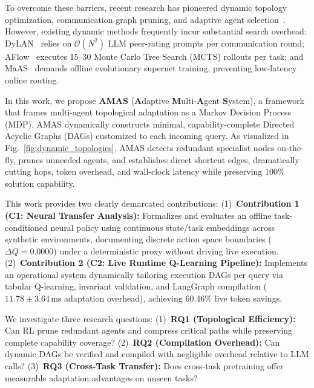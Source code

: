 \documentclass[conference]{IEEEtran}
\begin{document}
To overcome these barriers, recent research has pioneered dynamic topology optimization, communication graph pruning, and adaptive agent selection~\cite{liu2024dylan,zhuge2024gptswarm,zhang2024aflow,Zhang2025MaAS,Li2025AdaptiveGraphPruning,xiao2026agentdropout,zhang2025gdesigner}. However, existing dynamic methods frequently incur substantial search overhead: DyLAN~\cite{liu2024dylan} relies on $\mathcal{O}(N^2)$ LLM peer-rating prompts per communication round; AFlow~\cite{zhang2024aflow} executes 15--30 Monte Carlo Tree Search (MCTS) rollouts per task; and MaAS~\cite{Zhang2025MaAS} demands offline evolutionary supernet training, preventing low-latency online routing.

In this work, we propose \textbf{AMAS} (\textbf{A}daptive \textbf{M}ulti-\textbf{A}gent \textbf{S}ystem), a framework that frames multi-agent topological adaptation as a Markov Decision Process (MDP). AMAS dynamically constructs minimal, capability-complete Directed Acyclic Graphs (DAGs) customized to each incoming query. As visualized in Fig.~\ref{fig:dynamic_topologies}, AMAS detects redundant specialist nodes on-the-fly, prunes unneeded agents, and establishes direct shortcut edges, dramatically cutting hops, token overhead, and wall-clock latency while preserving 100\% solution capability.

This work provides two clearly demarcated contributions:
(1)~\textbf{Contribution 1 (C1: Neural Transfer Analysis):} Formalizes and evaluates an offline task-conditioned neural policy using continuous state/task embeddings across synthetic environments, documenting discrete action space boundaries ($\Delta Q = 0.0000$) under a deterministic proxy without driving live execution.
(2)~\textbf{Contribution 2 (C2: Live Runtime Q-Learning Pipeline):} Implements an operational system dynamically tailoring execution DAGs per query via tabular Q-learning, invariant validation, and LangGraph compilation ($11.78 \pm 3.64$\,ms adaptation overhead), achieving 60.46\% live token savings.

We investigate three research questions: (1)~\textbf{RQ1 (Topological Efficiency):} Can RL prune redundant agents and compress critical paths while preserving complete capability coverage? (2)~\textbf{RQ2 (Compilation Overhead):} Can dynamic DAGs be verified and compiled with negligible overhead relative to LLM calls? (3)~\textbf{RQ3 (Cross-Task Transfer):} Does cross-task pretraining offer measurable adaptation advantages on unseen tasks?
\end{document}

